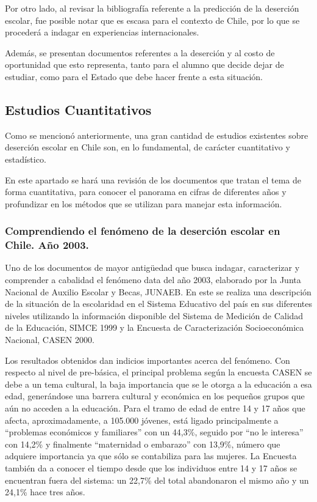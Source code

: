 Por otro lado, al revisar la bibliografía referente a la predicción de la deserción escolar, fue posible notar que es escasa para el contexto de Chile, por lo que se procederá a indagar en experiencias internacionales. 

Además, se presentan documentos referentes a la deserción y al costo de oportunidad que esto representa, tanto para el alumno que decide dejar de estudiar, como para el Estado que debe hacer frente a esta situación. 

\subsection{Estudios Cuantitativos}
Como se mencionó anteriormente, una gran cantidad de estudios existentes sobre deserción escolar en Chile son, en lo fundamental, de carácter cuantitativo y estadístico. 

En este apartado se hará una revisión de los documentos que tratan el tema de forma cuantitativa, para conocer el panorama en cifras de diferentes años y profundizar en los métodos que se utilizan para manejar esta información. 

\subsubsection{Comprendiendo el fenómeno de la deserción escolar en Chile. Año 2003.}
Uno de los documentos de mayor antigüedad que busca indagar, caracterizar y comprender a cabalidad el fenómeno data del año 2003, elaborado por la Junta Nacional de Auxilio Escolar y Becas, JUNAEB. En este se realiza una descripción de la situación de la escolaridad en el Sistema Educativo del país en sus diferentes niveles utilizando la información disponible del Sistema de Medición de Calidad de la Educación, SIMCE 1999 y la Encuesta de Caracterización Socioeconómica Nacional, CASEN 2000. 

Los resultados obtenidos dan indicios importantes acerca del fenómeno. Con respecto al nivel de pre-básica, el principal problema según la encuesta CASEN se debe a un tema cultural, la baja importancia que se le otorga a la educación a esa edad, generándose una barrera cultural y económica en los pequeños grupos que aún no acceden a la educación. Para el tramo de edad de entre 14 y 17 años que afecta, aproximadamente, a 105.000 jóvenes, está ligado principalmente a “problemas económicos y familiares” con un 44,3\%, seguido por “no le interesa” con 14,2\% y finalmente “maternidad o embarazo” con 13,9\%, número que adquiere importancia ya que sólo se contabiliza para las mujeres. La Encuesta también da a conocer el tiempo desde que los individuos entre 14 y 17 años se encuentran fuera del sistema: un 22,7\% del total abandonaron el mismo año y un 24,1\% hace tres años. 

